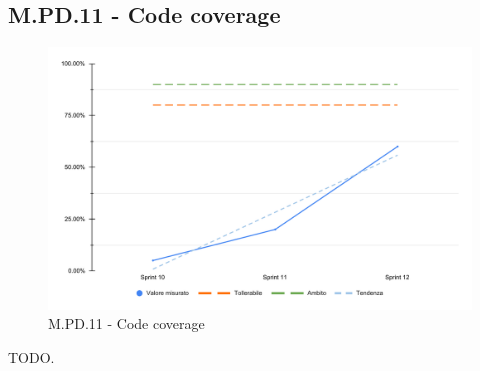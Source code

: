 \subsection{M.PD.11 - Code coverage}

\begin{figure}[H]
  \centering
  \includegraphics[width=\textwidth]{assets/code_coverage.pdf}
  \caption{M.PD.11 - Code coverage}
\end{figure}

\par TODO.